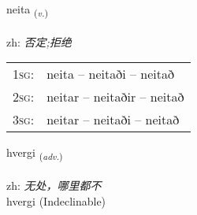 \documentclass[frontgrid, backgrid]{flacards}\usepackage[]{graphicx}\usepackage[]{color}
\begin{document}
\renewcommand{\flhead}{\vskip5pt \fboxsep=0pt {\small\bfseries\footnotesize Sagnorð | 动词}}
\renewcommand{\fcfoot}{\vskip5pt \fboxsep=0pt \hspace{2pt}{\small\bfseries\footnotesize 2K}}

\renewcommand{\blhead}{\vskip5pt {\small\bfseries\footnotesize Sagnorð | 动词 }}
\renewcommand{\bcfoot}{\vskip5pt \hspace{2pt}{\small\bfseries\footnotesize 2K}}


{neita \small{\textsubscript{(\textit{v.})}} \\[1ex] %
\textphonetic{[neiːta]} \\
zh: \emph{否定;拒绝} \\  [2ex]
\renewcommand*{\arraystretch}{0.8}
\begin{tabular}{p{1cm}l}
\textsc{1sg}: & neita -- neitaði -- neitað \\ 
\textsc{2sg}: & neitar -- neitaðir -- neitað \\ 
\textsc{3sg}: & neitar -- neitaði -- neitað \\ 
\end{tabular}
}


\renewcommand{\flhead}{\vskip5pt \fboxsep=0pt {\small\bfseries\footnotesize Atviksorð | 副词}}
\renewcommand{\fcfoot}{\vskip5pt \fboxsep=0pt \hspace{2pt}{\small\bfseries\footnotesize 2K}}

\renewcommand{\blhead}{\vskip5pt {\small\bfseries\footnotesize Atviksorð | 副词 }}
\renewcommand{\bcfoot}{\vskip5pt \hspace{2pt}{\small\bfseries\footnotesize 2K}}


{hvergi \small{\textsubscript{(\textit{adv.})}} \\[1ex]
\textphonetic{[kʰvɛrcɪ]} \\
zh: \emph{无处，哪里都不} \\  [2ex]
hvergi (Indeclinable)}

\renewcommand{\flhead}{\vskip5pt \fboxsep=0pt {\small\bfseries\footnotesize Lýsingarorð | 形容词}}
\renewcommand{\fcfoot}{\vskip5pt \fboxsep=0pt \hspace{2pt}{\small\bfseries\footnotesize 2K}}
\end{document}

